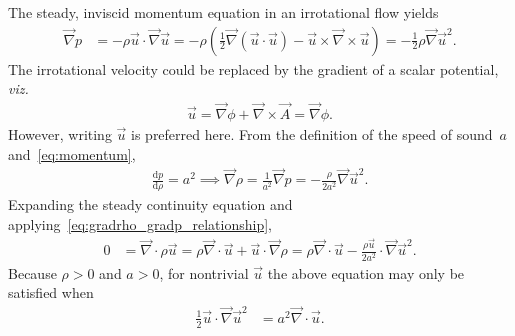 \documentclass[letterpaper,11pt,nointlimits,reqno]{amsart}
\begin{document}
The steady, inviscid momentum equation in an irrotational flow yields
\begin{align}
    \vec{\nabla}p
    &= -\rho \vec{u}\cdot\vec{\nabla}\vec{u}
     = -\rho \left(   \frac{1}{2}\vec{\nabla}\left(\vec{u}\cdot\vec{u}\right)
                    - \vec{u}\times\vec{\nabla}\times\vec{u}
        \right)
     = - \frac{1}{2} \rho \vec{\nabla}\vec{u}^2
\label{eq:momentum}
.
\end{align}
The irrotational velocity could be replaced by the gradient of a scalar
potential, \emph{viz.}
\begin{align}
  \vec{u} = \vec{\nabla}\phi + \vec{\nabla}\times\vec{A} = \vec{\nabla}{\phi}
  .
\end{align}
However, writing $\vec{u}$ is preferred here.  From the definition of the speed
of sound~$a$ and~\eqref{eq:momentum},
\begin{align}
    \frac{\mathrm{d}p}{\mathrm{d}\rho} = a^2
    \implies
    \vec{\nabla}\rho = \frac{1}{a^2} \vec{\nabla} p
                     = - \frac{\rho}{2a^2} \vec{\nabla}\vec{u}^2
\label{eq:gradrho_gradp_relationship}
.
\end{align}
Expanding the steady continuity equation and
applying~\eqref{eq:gradrho_gradp_relationship},
\begin{align}
  0 &= \vec{\nabla}\cdot\rho\vec{u}
     = \rho\vec{\nabla}\cdot\vec{u} + \vec{u}\cdot\vec{\nabla}\rho
     = \rho\vec{\nabla}\cdot\vec{u}
     - \frac{\rho\vec{u}}{2a^2} \cdot \vec{\nabla}\vec{u}^2
\label{eq:continuity}
.
\end{align}
Because $\rho>0$ and $a>0$, for nontrivial $\vec{u}$ the above
equation may only be satisfied when
\begin{align}
       \frac{1}{2} \vec{u}\cdot \vec{\nabla}\vec{u}^2
    &= a^2 \vec{\nabla}\cdot\vec{u}
.
\label{eq:momentum_and_continuity}
\end{align}
\end{document}
